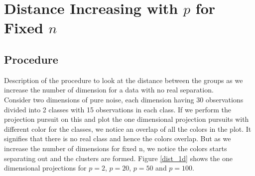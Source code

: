 \documentclass[12]{article}
\begin{document}






\section{Distance Increasing with $p$ for Fixed $n$} \label{sec:distance}

\subsection{Procedure}
{\color{red} Description of the procedure to look at the distance between the groups as we increase the number of dimension for a data with no real separation.} \\
Consider two dimensions of pure noise, each dimension having 30 observations divided into 2 classes with 15 observations in each class. If we perform the projection pursuit on this and plot the one dimensional projection pursuits with different color for the classes, we notice an overlap of all the colors in the plot. It signifies that there is no real class and hence the colors overlap. But as we increase the number of dimensions for fixed n, we notice the colors starts separating out and the clusters are formed. Figure \ref{dist_1d} shows the one dimensional projections for $p=2$, $p=20$, $p=50$ and $p=100$. \\
\end{document}
